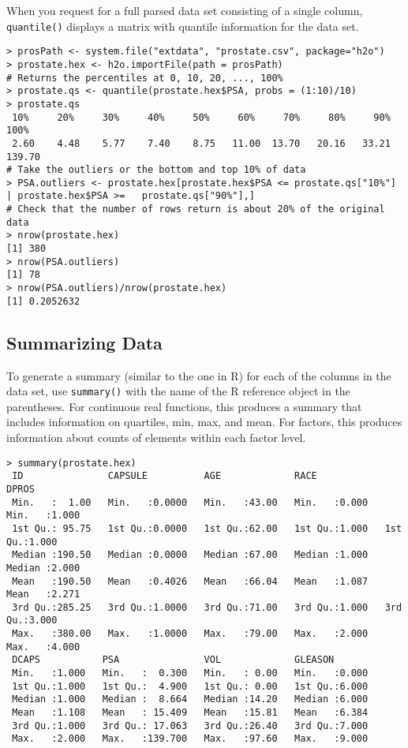 {When you request for a full parsed data set consisting of a single column, {\texttt{quantile()}} displays a matrix with quantile information for the data set. 
\smallskip

\begin{lstlisting}[style=R]
> prosPath <- system.file("extdata", "prostate.csv", package="h2o")
> prostate.hex <- h2o.importFile(path = prosPath)
# Returns the percentiles at 0, 10, 20, ..., 100%
> prostate.qs <- quantile(prostate.hex$PSA, probs = (1:10)/10)
> prostate.qs
 10%     20%     30%     40%     50%     60%     70%     80%     90%    100% 
 2.60    4.48    5.77    7.40    8.75   11.00  13.70   20.16   33.21  139.70 
# Take the outliers or the bottom and top 10% of data
> PSA.outliers <- prostate.hex[prostate.hex$PSA <= prostate.qs["10%"] | prostate.hex$PSA >=   prostate.qs["90%"],]
# Check that the number of rows return is about 20% of the original data
> nrow(prostate.hex)
[1] 380
> nrow(PSA.outliers)
[1] 78
> nrow(PSA.outliers)/nrow(prostate.hex)
[1] 0.2052632
\end{lstlisting}

\newpage
\subsection{Summarizing Data}


To generate a summary (similar to the one in R) for each of the columns in the data set, use {\texttt{summary()}} with the name of the R reference object in the parentheses.
For continuous real functions, this produces a summary that includes information on quartiles, min, max, and mean. 
For factors, this produces information about counts of elements within each factor level. 

\begin{lstlisting}[style=R]
> summary(prostate.hex)
 ID               CAPSULE          AGE             RACE            DPROS          
 Min.   :  1.00   Min.   :0.0000   Min.   :43.00   Min.   :0.000   Min.   :1.000  
 1st Qu.: 95.75   1st Qu.:0.0000   1st Qu.:62.00   1st Qu.:1.000   1st Qu.:1.000  
 Median :190.50   Median :0.0000   Median :67.00   Median :1.000   Median :2.000  
 Mean   :190.50   Mean   :0.4026   Mean   :66.04   Mean   :1.087   Mean   :2.271  
 3rd Qu.:285.25   3rd Qu.:1.0000   3rd Qu.:71.00   3rd Qu.:1.000   3rd Qu.:3.000  
 Max.   :380.00   Max.   :1.0000   Max.   :79.00   Max.   :2.000   Max.   :4.000  
 DCAPS           PSA               VOL             GLEASON        
 Min.   :1.000   Min.   :  0.300   Min.   : 0.00   Min.   :0.000  
 1st Qu.:1.000   1st Qu.:  4.900   1st Qu.: 0.00   1st Qu.:6.000  
 Median :1.000   Median :  8.664   Median :14.20   Median :6.000  
 Mean   :1.108   Mean   : 15.409   Mean   :15.81   Mean   :6.384  
 3rd Qu.:1.000   3rd Qu.: 17.063   3rd Qu.:26.40   3rd Qu.:7.000  
 Max.   :2.000   Max.   :139.700   Max.   :97.60   Max.   :9.000
\end{lstlisting}

}

